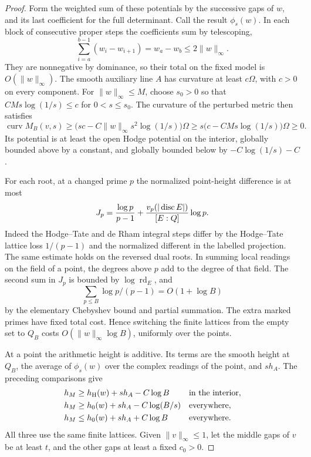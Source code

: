 \begin{proof}
Form the weighted sum of these potentials by the successive gaps
of \(w\), and its last coefficient for the full determinant. Call
the result \(\phi_s(w)\). In each block of consecutive proper steps the coefficients sum by telescoping, 
\[
 \sum_{i=a}^{b-1}(w_i-w_{i+1})=w_a-w_b\le2\|w\|_\infty.
\]
 They are nonnegative by dominance, so their total on the fixed model is \(O(\|w\|_\infty)\).
The smooth auxiliary line \(A\) has curvature at least \(c\Omega\),
with \(c>0\) on every component. For \(\|w\|_\infty\le M\), choose
\(s_0>0\) so that \(CMs\log(1/s)\le c\) for \(0<s\le s_0\).
The curvature of the perturbed metric then satisfies
\[
 \operatorname{curv} M_B(v,s)
 \ge \bigl(sc-C\|w\|_\infty s^2\log(1/s)\bigr)\Omega
 \ge s\bigl(c-CMs\log(1/s)\bigr)\Omega\ge0 .
\] Its potential is at least the open Hodge
potential on the interior, globally bounded above by a constant,
and globally bounded below by \(-C\log(1/s)-C\).

For each root, at a changed prime \(p\) the normalized point-height
difference is at most
\[
   J_p=\frac{\log p}{p-1}+
     \frac{v_p(|\operatorname{disc}E|)}{[E:Q]}\log p .
\]
Indeed the Hodge--Tate and de Rham integral steps differ by the
Hodge--Tate lattice loss \(1/(p-1)\) and the normalized different
in the labelled projection. The same estimate holds on the reversed
dual roots. In summing local readings on the field of a point,
the degrees above \(p\) add to the degree of that field. The second
sum in \(J_p\) is bounded by \(\log\operatorname{rd}_E\), and
\[
 \sum_{p\le B}\log p/(p-1)=O(1+\log B)
\]
by the elementary
Chebyshev bound and partial summation. The extra marked primes have
fixed total cost. Hence switching the finite lattices from the
empty set to \(Q_B\) costs \(O(\|w\|_\infty\log B)\), uniformly
over the points. \cite{scholze-weinstein-flag}\label{cor:flag-wall-positivity-3}

At a point the arithmetic height is additive. Its terms are the
smooth height at \(Q_B\), the average of \(\phi_s(w)\) over the
complex readings of the point, and \(s h_A\). The preceding
comparisons give
\begin{align*}
  h_M&\ge h_{\rm H}(w)+s h_A-C\log B &&\text{in the interior},\\
  h_M&\ge h_0(w)+s h_A-C\log(B/s) &&\text{everywhere},\\
  h_M&\le h_0(w)+s h_A+C\log B &&\text{everywhere}.
\end{align*}
All three use the same finite lattices. Given \(\|v\|_\infty\le1\),
let the middle gaps of \(v\) be at least \(t\), and the other gaps
at least a fixed \(c_0>0\).


\end{proof}
